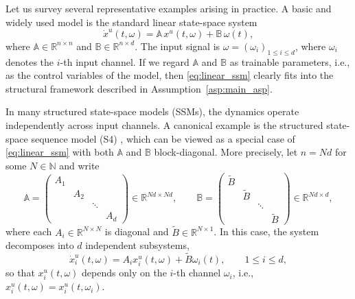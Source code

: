 \documentclass[11pt]{amsart}
\numberwithin{equation}{section} %
\theoremstyle{remark}
\begin{document}
Let us survey several representative examples arising in practice. A basic and widely used model is the standard linear state-space system
\begin{equation}\label{eq:linear_ssm}
    \dot{x}^u(t, \omega) = \mathbb{A}\,x^u(t, \omega) + \mathbb{B}\,\omega(t),
\end{equation}
where $\mathbb{A} \in \mathbb{R}^{n \times n}$ and $\mathbb{B} \in \mathbb{R}^{n \times d}$. The input signal is $\omega = (\omega_i)_{1 \leq i \leq d}$, where $\omega_i$ denotes the $i$-th input channel. If we regard $\mathbb{A}$ and $\mathbb{B}$ as trainable parameters, i.e., as the control variables of the model, then \eqref{eq:linear_ssm} clearly fits into the structural framework described in Assumption~\ref{asp:main_asp}.

In many structured state-space models (SSMs), the dynamics operate independently across input channels. A canonical example is the structured state-space sequence model (S4) \cite{gu2021efficiently,muca2024theoretical}, which can be viewed as a special case of \eqref{eq:linear_ssm} with both $\mathbb{A}$ and $\mathbb{B}$ block-diagonal. More precisely, let $n = Nd$ for some $N \in \mathbb{N}$ and write
\[
    \mathbb{A} =
    \begin{pmatrix}
        A_1 &     &        &     \\
            & A_2 &        &     \\
            &     & \ddots &     \\
            &     &        & A_d
    \end{pmatrix}
    \in \mathbb{R}^{Nd \times Nd}, \qquad
    \mathbb{B} =
    \begin{pmatrix}
        \tilde{B} &   &        &   \\
          & \tilde{B} &        &   \\
          &   & \ddots &   \\
          &   &        & \tilde{B}
    \end{pmatrix}
    \in \mathbb{R}^{Nd \times d},
\]
where each $A_i \in \mathbb{R}^{N \times N}$ is diagonal and $\tilde{B} \in \mathbb{R}^{N \times 1}$. In this case, the system decomposes into $d$ independent subsystems,
\begin{equation}\label{eq:diag_linear_ssm}
    \dot{x}_i^u(t, \omega) = A_i x_i^u(t, \omega) + \tilde{B} \omega_i(t),
    \qquad 1 \leq i \leq d,
\end{equation}
so that $x_i^u(t,\omega)$ depends only on the $i$-th channel $\omega_i$, i.e., $x_i^u(t,\omega) = x_i^u(t,\omega_i)$.
\end{document}
